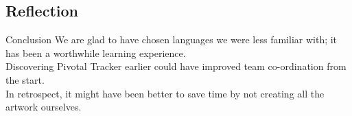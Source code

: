 \documentclass{beamer}
\begin{document}
\subsection{Reflection}

\begin{frame}{Conclusion}
  We are glad to have chosen languages we were less familiar with; it has been a worthwhile learning experience.\\
  \vspace{\baselineskip}
  Discovering Pivotal Tracker earlier could have improved team co-ordination from the start.\\
  \vspace{\baselineskip}
  In retrospect, it might have been better to save time by not creating all the artwork ourselves.
\end{frame}
\end{document}
